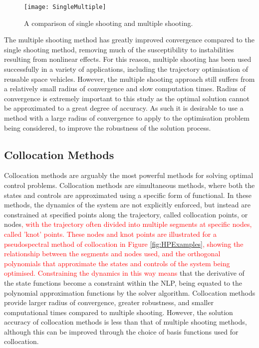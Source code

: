 \begin{figure}[ht]
	\centering
	\texttt{[image: SingleMultiple]}
	\caption{A comparison of single shooting and multiple shooting\cite{Kelly2015}.}
	\label{fig:multipleshooting}
\end{figure}

The multiple shooting method has greatly improved convergence compared to the single shooting method, removing much of the susceptibility to instabilities resulting from nonlinear effects. For this reason, multiple shooting has been used successfully in a variety of applications, including the trajectory optimisation of reusable space vehicles\cite{Maddock2018}. However, the multiple shooting approach still suffers from a relatively small radius of convergence and slow computation times\cite{Fasano2013}. Radius of convergence is extremely important to this study as the optimal solution cannot be approximated to a great degree of accuracy. As such it is desirable to use a method with a large radius of convergence to apply to the optimisation problem being considered, to improve the robustness of the solution process.

\subsection{Collocation Methods}

Collocation methods are arguably the most powerful methods for solving optimal control problems\cite{Rao2009}. Collocation methods are simultaneous methods, where both the states and controls are approximated using a specific form of functional\cite{Kelly2015,Rao2009}. In these methods, the dynamics of the system are not explicitly enforced, but instead are constrained at specified points along the trajectory, called collocation points, or nodes\cite{Kelly2015}\textcolor{red}{, with the trajectory often divided into multiple segments at specific nodes, called 'knot' points. These nodes and knot points are illustrated for a pseudospectral method of collocation in Figure \ref{fig:HPExamples}, showing the relationship between the segments and nodes used, and the orthogonal polynomials that approximate the states and controls of the system being optimised. Constraining the dynamics in this way means} that the derivative of the state functions become a constraint within the NLP, being equated to the polynomial approximation functions by the solver algorithm. 
Collocation methods provide larger radius of convergence, greater robustness, and smaller computational times compared to multiple shooting\cite{Fasano2013}. However, the solution accuracy of collocation methods is less than that of multiple shooting methods\cite{Fasano2013}, although this can be improved through the choice of basis functions used for collocation\cite{Rao2009}.

